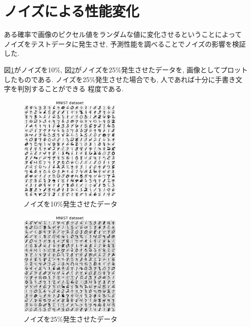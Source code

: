 \documentclass[10pt,a4paper,twocolumn]{jarticle}
\begin{document}

\section{ノイズによる性能変化}
ある確率で画像のピクセル値をランダムな値に変化させるということによって
ノイズをテストデータに発生させ, 予測性能を調べることでノイズの影響を検証した. 

図\ref{fig:noise-0.1}がノイズを10\%,
図\ref{fig:noise-0.25}がノイズを25\%発生させたデータを, 
画像としてプロットしたものである. 
ノイズを25\%発生させた場合でも, 人であれば十分に手書き文字を判別することができる
程度である. 
\begin{figure}[htbp]
  \centering
  \includegraphics[width=0.45\textwidth]{assets/img/tiled_mnist_nl0.1.eps}
  \caption{ノイズを10\%発生させたデータ}
  \label{fig:noise-0.1}
\end{figure}
\begin{figure}[htbp]
  \centering
  \includegraphics[width=0.45\textwidth]{assets/img/tiled_mnist_nl0.25.eps}
  \caption{ノイズを25\%発生させたデータ}
  \label{fig:noise-0.25}
\end{figure}
\end{document}
